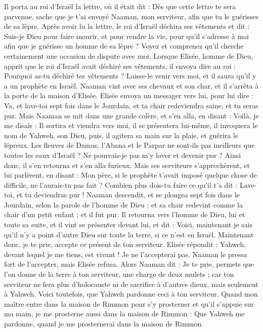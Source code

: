 \begin{multicols}{2}
Il porta au roi d’Israël la lettre, où il était dit : Dès que cette lettre te sera parvenue, sache que je t’ai envoyé Naaman, mon serviteur, afin que tu le guérisses de sa lèpre.
Après avoir lu la lettre, le roi d’Israël déchira ses vêtements et dit : Suis-je Dieu pour faire mourir, et pour rendre la vie, pour qu’il s’adresse à moi afin que je guérisse un homme de sa lèpre ? Voyez et comprenez qu’il cherche certainement une occasion de dispute avec moi.
Lorsque Elisée, homme de Dieu, apprit que le roi d’Israël avait déchiré ses vêtements, il envoya dire au roi : Pourquoi as-tu déchiré tes vêtements ? Laisse-le venir vers moi, et il saura qu’il y a un prophète en Israël.
Naaman vint avec ses chevaux et son char, et il s’arrêta à la porte de la maison d’Elisée.
Elisée envoya un messager vers lui, pour lui dire : Va, et lave-toi sept fois dans le Jourdain, et ta chair redeviendra saine, et tu seras pur.
Mais Naaman se mit dans une grande colère, et s’en alla, en disant : Voilà, je me disais : Il sortira et viendra vers moi, il se présentera lui-même, il invoquera le nom de Yahweh, son Dieu, puis, il agitera sa main sur la plaie, et guérira le lépreux.
Les fleuves de Damas, l’Abana et le Parpar ne sont-ils pas meilleurs que toutes les eaux d’Israël ? Ne pourrais-je pas m’y laver et devenir pur ? Ainsi donc, il s’en retourna et s’en alla furieux.
Mais ses serviteurs s’approchèrent, et lui parlèrent, en disant : Mon père, si le prophète t’avait imposé quelque chose de difficile, ne l’aurais-tu pas fait ? Combien plus dois-tu faire ce qu’il t’a dit : Lave-toi, et tu deviendras pur !
Naaman descendit, et se plongea sept fois dans le Jourdain, selon la parole de l’homme de Dieu ; et sa chair redevint comme la chair d’un petit enfant ; et il fut pur.
Il retourna vers l’homme de Dieu, lui et toute sa suite, et il vint se présenter devant lui, et dit : Voici, maintenant je sais qu’il n’y a point d’autre Dieu sur toute la terre, si ce n’est en Israël. Maintenant donc, je te prie, accepte ce présent de ton serviteur.
Elisée répondit : Yahweh, devant lequel je me tiens, est vivant ! Je ne l’accepterai pas. Naaman le pressa fort de l’accepter, mais Elisée refusa.
Alors Naaman dit : Je te prie, permets que l’on donne de la terre à ton serviteur, une charge de deux mulets ; car ton serviteur ne fera plus d’holocauste ni de sacrifice à d’autres dieux, mais seulement à Yahweh.
Voici toutefois, que Yahweh pardonne ceci à ton serviteur. Quand mon maître entre dans la maison de Rimmon pour s’y prosterner et qu’il s’appuie sur ma main, je me prosterne aussi dans la maison de Rimmon : Que Yahweh me pardonne, quand je me prosternerai dans la maison de Rimmon.

\end{multicols}
